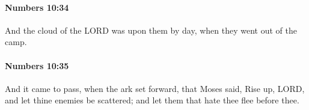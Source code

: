 		\paragraph{Numbers 10:34} %
			\label{NUMBERS-10-34}

			And the cloud of the LORD was upon them by day, when they went out of the camp.


		\paragraph{Numbers 10:35} %
			\label{NUMBERS-10-35}

			And it came to pass, when the ark set forward, that Moses said, Rise up, LORD, and let thine enemies be scattered; and let them that hate thee flee before thee.


